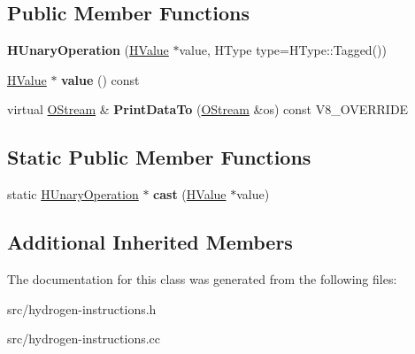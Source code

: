 \subsection*{Public Member Functions}
\begin{DoxyCompactItemize}
\item 
\hypertarget{classv8_1_1internal_1_1_h_unary_operation_a1f6d02f9f6ce99c74d15915ba8b60aa2}{}{\bfseries H\+Unary\+Operation} (\hyperlink{classv8_1_1internal_1_1_h_value}{H\+Value} $\ast$value, H\+Type type=H\+Type\+::\+Tagged())\label{classv8_1_1internal_1_1_h_unary_operation_a1f6d02f9f6ce99c74d15915ba8b60aa2}

\item 
\hypertarget{classv8_1_1internal_1_1_h_unary_operation_af719639819236af58d79389ba54ec70c}{}\hyperlink{classv8_1_1internal_1_1_h_value}{H\+Value} $\ast$ {\bfseries value} () const \label{classv8_1_1internal_1_1_h_unary_operation_af719639819236af58d79389ba54ec70c}

\item 
\hypertarget{classv8_1_1internal_1_1_h_unary_operation_acdb0dfc9c1ba1e06a8923abea2802a2f}{}virtual \hyperlink{classv8_1_1internal_1_1_o_stream}{O\+Stream} \& {\bfseries Print\+Data\+To} (\hyperlink{classv8_1_1internal_1_1_o_stream}{O\+Stream} \&os) const V8\+\_\+\+O\+V\+E\+R\+R\+I\+D\+E\label{classv8_1_1internal_1_1_h_unary_operation_acdb0dfc9c1ba1e06a8923abea2802a2f}

\end{DoxyCompactItemize}
\subsection*{Static Public Member Functions}
\begin{DoxyCompactItemize}
\item 
\hypertarget{classv8_1_1internal_1_1_h_unary_operation_aa5104f29be9e17219c6032893ac4c468}{}static \hyperlink{classv8_1_1internal_1_1_h_unary_operation}{H\+Unary\+Operation} $\ast$ {\bfseries cast} (\hyperlink{classv8_1_1internal_1_1_h_value}{H\+Value} $\ast$value)\label{classv8_1_1internal_1_1_h_unary_operation_aa5104f29be9e17219c6032893ac4c468}

\end{DoxyCompactItemize}
\subsection*{Additional Inherited Members}


The documentation for this class was generated from the following files\+:\begin{DoxyCompactItemize}
\item 
src/hydrogen-\/instructions.\+h\item 
src/hydrogen-\/instructions.\+cc\end{DoxyCompactItemize}
